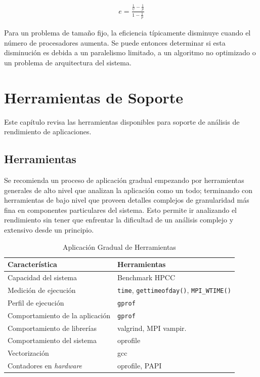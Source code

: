 \documentclass[a4paper]{report}
\begin{document}
\begin{eqnarray}
\label{eq:karp-flatt}
 e = \frac{\frac{1}{\psi} - \frac{1}{p}}{1 - \frac{1}{p}} 
\end{eqnarray}

Para un problema de tamaño fijo, la eficiencia típicamente disminuye cuando
el número de procesadores aumenta. Se puede entonces determinar si esta disminución
es debida a un paralelismo limitado, a un algoritmo no optimizado o un problema de
arquitectura del sistema.

\chapter{Herramientas de Soporte}

Este capítulo revisa las herramientas disponibles para soporte de análisis
de rendimiento de aplicaciones.

\section{Herramientas}

Se recomienda un proceso de aplicación gradual empezando por herramientas generales de alto nivel que analizan la aplicación como un todo; terminando con herramientas de bajo nivel que proveen detalles complejos de granularidad más fina en componentes particulares del sistema. Esto permite ir analizando el rendimiento sin tener que enfrentar la dificultad de un análisis complejo y extensivo desde un principio.

\begin{table}[H]
\caption{Aplicación Gradual de Herramientas}
\begin{tabular}{|l|l|} \hline
{\bf Característica} & {\bf Herramientas} \\ \hline
Capacidad del sistema & Benchmark HPCC \\ \hline
Medición de ejecución & {\tt time}, {\tt gettimeofday()}, {\tt MPI\_WTIME()} \\ \hline
Perfil de ejecución & {\tt gprof} \\ \hline
Comportamiento de la aplicación & {\tt gprof} \\ \hline
Comportamiento de librerías & valgrind, MPI vampir. \\ \hline
Comportamiento del sistema & oprofile \\ \hline
Vectorización & gcc \\ \hline
Contadores en {\it hardware} & oprofile, PAPI \\ \hline
\end{tabular}
\label{table:tools}
\end{table}
\end{document}
